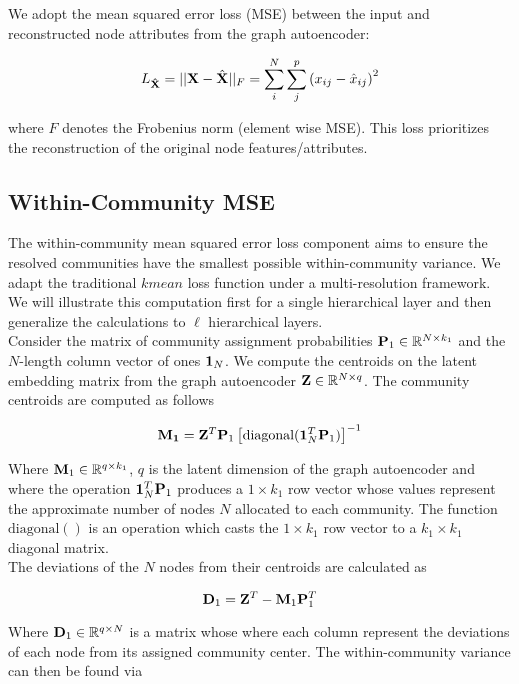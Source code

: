 \documentclass[a4paper,12pt]{article}
\begin{document}
					We adopt the mean squared error loss (MSE) between the input and reconstructed node attributes from the graph autoencoder:
					
					\[L_{\bf \hat{X}} = ||{\bf X} - \hat{\bf X}||_F = \sum_i^N \sum_j^p \left(x_{ij} - \hat{x}_{ij}\right)^2 \]
					
					where $F$ denotes the Frobenius norm (element wise MSE). 
					This loss prioritizes the reconstruction of the original node features/attributes. \\
				
					
				\subsection*{Within-Community MSE}
					
					The within-community mean squared error loss component aims to ensure the resolved communities have the smallest possible within-community variance. We adapt the traditional $kmean$ loss function under a multi-resolution framework. We will illustrate this computation first for a single hierarchical layer and then generalize the calculations to $\ell$ hierarchical layers. \\
					
					Consider the matrix of community assignment probabilities ${\bf P}_1\in \mathbb{R}^{N\times k_1}$ and the $N$-length column vector of ones ${\bf 1}_N$. We compute the centroids on the latent embedding matrix from the graph autoencoder ${\bf Z}\in \mathbb{R}^{N\times q}$. The community centroids are computed as follows
					
					\[ {\bf M_1} = {\bf Z}^T{\bf P}_1 \left[\text{diagonal}({\bf 1}_N^T {\bf P}_1)\right]^{-1}\]
					
					Where ${\bf M}_1 \in \mathbb{R}^{q\times k_1}$, $q$ is the latent dimension of the graph autoencoder and where the operation ${\bf 1}_N^T {\bf P}_1$ produces a $1 \times k_1$ row vector whose values represent the approximate number of nodes $N$ allocated to each community. The function $\text{diagonal}()$ is an operation which casts the $1 \times k_1$ row vector to a $k_1 \times k_1$ diagonal matrix. \\
					
					The deviations of the $N$ nodes from their centroids are calculated as 
					
					\[ {\bf D}_1 ={\bf Z}^T - {\bf M}_1{\bf P}_1^T \]
					
					Where ${\bf D}_1\in \mathbb{R}^{q\times N}$ is a matrix whose where each column represent the deviations of each node from its assigned community center. The within-community variance can then be found via
					
\end{document}
